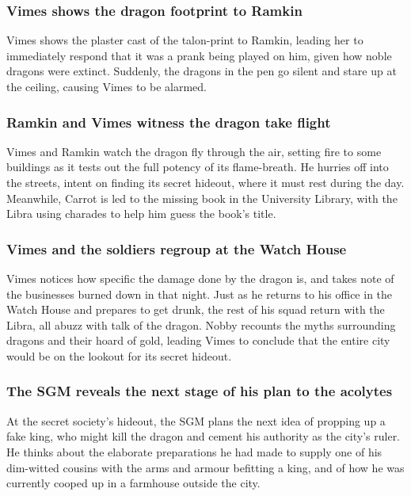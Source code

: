 \subsubsection{\Gls{Vimes} shows the dragon footprint to \Gls{Ramkin}}
\Gls{Vimes} shows the plaster cast of the talon-print to \Gls{Ramkin}, leading her to immediately
respond that it was a prank being played on him, given how noble dragons were extinct. Suddenly,
the dragons in the pen go silent and stare up at the ceiling, causing \Gls{Vimes} to be alarmed.

\subsubsection{\Gls{Ramkin} and \Gls{Vimes} witness the dragon take flight}
\Gls{Vimes} and \Gls{Ramkin} watch the dragon fly through the air, setting fire to some buildings
as it tests out the full potency of its flame-breath. He hurries off into the streets, intent on
finding its secret hideout, where it must rest during the day. Meanwhile, \Gls{Carrot} is led to the
missing book in the University Library, with the \Gls{Libra} using charades to help him guess the
book's title.

\subsubsection{\Gls{Vimes} and the soldiers regroup at the Watch House}
\Gls{Vimes} notices how specific the damage done by the dragon is, and takes note of the businesses
burned down in that night. Just as he returns to his office in the Watch House and prepares to get
drunk, the rest of his squad return with the \Gls{Libra}, all abuzz with talk of the dragon.
\Gls{Nobby} recounts the myths surrounding dragons and their hoard of gold, leading \Gls{Vimes} to
conclude that the entire city would be on the lookout for its secret hideout.

\subsubsection{The \Gls{SGM} reveals the next stage of his plan to the acolytes}
At the secret society's hideout, the \Gls{SGM} plans the next idea of propping up a fake king, who
might kill the dragon and cement his authority as the city's ruler. He thinks about the elaborate
preparations he had made to supply one of his dim-witted cousins with the arms and armour befitting
a king, and of how he was currently cooped up in a farmhouse outside the city.

